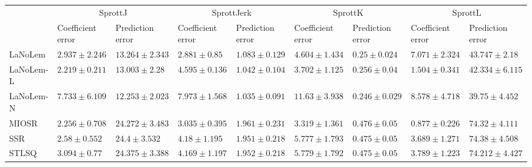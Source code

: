 \begin{table*}
{\begin{tabular}{lllllllll}
 & \multicolumn{2}{c}{SprottJ} & \multicolumn{2}{c}{SprottJerk} & \multicolumn{2}{c}{SprottK} & \multicolumn{2}{c}{SprottL} \\
 & Coefficient error & Prediction error & Coefficient error & Prediction error & Coefficient error & Prediction error & Coefficient error & Prediction error \\
\midrule
LaNoLem & $2.937\pm 2.246$ & $13.264\pm 2.343$ & $\mathbf{2.881}\pm 0.85$ & $1.083\pm 0.129$ & $4.604\pm 1.434$ & $0.25\pm 0.024$ & $7.071\pm 2.324$ & $43.747\pm 2.18$ \\
LaNoLem-L & $\mathbf{2.219}\pm 0.211$ & $13.003\pm 2.28$ & $4.595\pm 0.136$ & $1.042\pm 0.104$ & $3.702\pm 1.125$ & $0.256\pm 0.04$ & $1.504\pm 0.341$ & $42.334\pm 6.115$ \\
LaNoLem-N & $7.733\pm 6.109$ & $\mathbf{12.253}\pm 2.023$ & $7.973\pm 1.568$ & $\mathbf{1.035}\pm 0.091$ & $11.63\pm 3.938$ & $\mathbf{0.246}\pm 0.029$ & $8.578\pm 4.718$ & $\mathbf{39.75}\pm 4.452$ \\
MIOSR & $2.256\pm 0.708$ & $24.272\pm 3.483$ & $3.035\pm 0.395$ & $1.961\pm 0.231$ & $\mathbf{3.319}\pm 1.361$ & $0.476\pm 0.05$ & $\mathbf{0.877}\pm 0.226$ & $74.32\pm 4.111$ \\
SSR & $2.58\pm 0.552$ & $24.4\pm 3.532$ & $4.18\pm 1.195$ & $1.951\pm 0.218$ & $5.777\pm 1.793$ & $0.475\pm 0.05$ & $3.689\pm 1.271$ & $74.38\pm 4.508$ \\
STLSQ & $3.094\pm 0.77$ & $24.375\pm 3.388$ & $4.169\pm 1.197$ & $1.952\pm 0.218$ & $5.779\pm 1.792$ & $0.475\pm 0.05$ & $3.789\pm 1.223$ & $74.212\pm 4.427$ \\

\midrule


\end{tabular}}
\end{table*}
